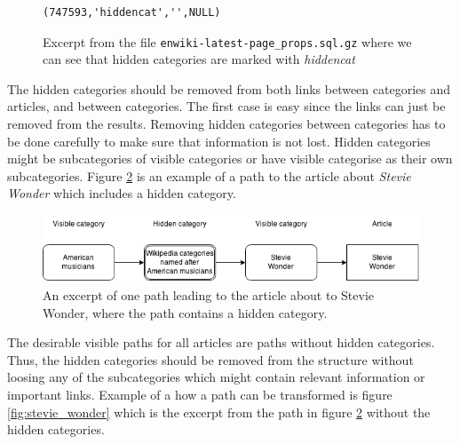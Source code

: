 \begin{figure}[h]
\centering
\begin{lstlisting}
(747593,'hiddencat','',NULL)
\end{lstlisting}
\caption[Insert statement for hidden category]{Excerpt from the file \texttt{enwiki-latest-page\_props.sql.gz} where we can see that hidden categories are marked with \emph{hiddencat}}
\label{fig:pageprops}
\end{figure}

The hidden categories should be removed from both links between categories and articles, and between categories. The first case is easy since the links can just be removed from the results. Removing hidden categories between categories has to be done carefully to make sure that information is not lost. Hidden categories might be subcategories of visible categories or have visible categorise as their own subcategories. Figure \ref{fig:stevie_wonder_hidden} is an example of a path to the article about \emph{Stevie Wonder} which includes a hidden category. 






\begin{figure}[h]
\centering
\includegraphics[width=\textwidth]{Chapters/Implementation/HiddenCategories/Stevie_wonder_hidden}
\caption[Example path with hidden category]{An excerpt of one path leading to the article about to Stevie Wonder, where the path contains a hidden category. }
\label{fig:stevie_wonder_hidden}
\end{figure}

The desirable visible paths for all articles are paths without hidden categories. Thus, the hidden categories should be removed from the structure without loosing any of the subcategories which might contain relevant information or  important links. Example of a how a path can be transformed is figure \ref{fig:stevie_wonder} which is the excerpt from the path in figure \ref{fig:stevie_wonder_hidden} without the hidden categories. 

